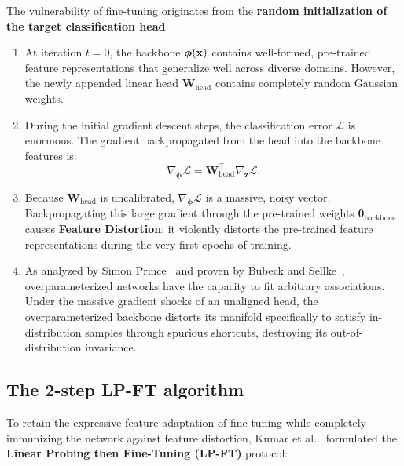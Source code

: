 The vulnerability of fine-tuning originates from the \textbf{random initialization of the target classification head}:
\begin{enumerate}[leftmargin=*]
  \item At iteration $t = 0$, the backbone $\boldsymbol{\phi}(\mathbf{x})$ contains well-formed, pre-trained feature representations that generalize well across diverse domains. However, the newly appended linear head $\mathbf{W}_{\text{head}}$ contains completely random Gaussian weights.
  \item During the initial gradient descent steps, the classification error $\mathcal{L}$ is enormous. The gradient backpropagated from the head into the backbone features is:
    \begin{equation}
    \nabla_{\boldsymbol{\phi}} \mathcal{L} = \mathbf{W}_{\text{head}}^\top \nabla_{\mathbf{z}} \mathcal{L}.
    \label{eq:head_backprop_feature_gradient}
    \end{equation}
  \item Because $\mathbf{W}_{\text{head}}$ is uncalibrated, $\nabla_{\boldsymbol{\phi}} \mathcal{L}$ is a massive, noisy vector. Backpropagating this large gradient through the pre-trained weights $\boldsymbol{\theta}_{\text{backbone}}$ causes \textbf{Feature Distortion}: it violently distorts the pre-trained feature representations during the very first epochs of training.
  \item As analyzed by Simon Prince~\cite{prince2023understanding} and proven by Bubeck and Sellke~\cite{bubeck2021universal}, overparameterized networks have the capacity to fit arbitrary associations. Under the massive gradient shocks of an unaligned head, the overparameterized backbone distorts its manifold specifically to satisfy in-distribution samples through spurious shortcuts, destroying its out-of-distribution invariance.
\end{enumerate}

\subsection{The 2-step LP-FT algorithm}
\label{sec:lp_ft_algorithm}

To retain the expressive feature adaptation of fine-tuning while completely immunizing the network against feature distortion, Kumar et al.~\cite{kumar2022fine} formulated the \textbf{Linear Probing then Fine-Tuning (LP-FT)} protocol:

